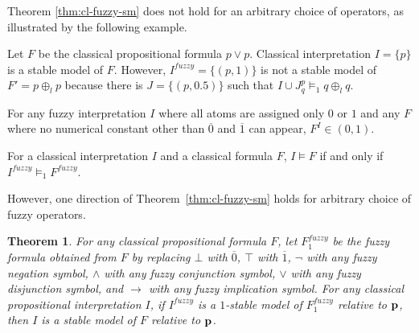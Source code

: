 \documentclass[runningheads]{llncs}
\newcommand{\cmag}{\color{magenta}}
\def\o{\overline}
\def\bi{\begin{itemize}}
\def\ei{\end{itemize}}
\def\i#1{\hbox{\it #1\/}}
\def\mi#1{\mathit{#1}}
\def\rar{\rightarrow}
\def\false{\hbox{\sc false}}
\def\true{\hbox{\sc true}}
\def\i#1{\hbox{\itshape #1\/}}
\def\for{\oplus}
\newtheorem{thm}{Theorem}
\begin{document}
Theorem \ref{thm:cl-fuzzy-sm} does not hold for an arbitrary choice of
operators, as illustrated by the following example.

\begin{example}
Let $F$ be the classical propositional formula $p\lor p$. 
Classical interpretation $I = \{p\}$ is a stable model of
$F$. However, $I^\mi{fuzzy}= \{(p,1)\}$ is not a stable model of 
$F' = p\for_l p$ because there is $J = \{(p, 0.5)\}$ such
that $I\cup J^p_q\models_1 q\for_l q$.
\end{example}



\BOCC
\cmag
\begin{lemma}\label{lem_crisp_assignment}
For any fuzzy interpretation $I$ where all atoms are assigned only $0$
or $1$ and any $F$ where no numerical constant other than $\o{0}$
and $\o{1}$ can appear, $F^I \in \left(0, 1\right)$.
\end{lemma}


\begin{lemma}\label{lem_true_eq_1}
For a classical interpretation $I$ and a classical formula $F$, $I \models F$ if and only if $I^\mi{fuzzy} \models_1 F^\mi{fuzzy}$.
\end{lemma}
\EOCC

However, one direction of Theorem~\ref{thm:cl-fuzzy-sm} holds for
arbitrary choice of fuzzy operators. 

\begin{thm} \label{thm:fuzzy-cl-sm}
For any classical propositional formula $F$, let $F_1^\mi{fuzzy}$
be the fuzzy formula obtained from $F$ by replacing $\bot$ with
$\o{0}$,  $\top$ with $\o{1}$, $\neg$ with any fuzzy
negation symbol, $\land$ with any fuzzy conjunction symbol, $\lor$ with
any fuzzy disjunction symbol, and $\rar$ with any fuzzy
implication symbol. For any classical propositional interpretation
$I$, if $I^\mi{fuzzy}$ is a $1$-stable
model of $F_1^\mi{fuzzy}$ relative to ${\bf p}$, then $I$ is a stable
model of $F$ relative to ${\bf p}$.
\end{thm}
\end{document}
